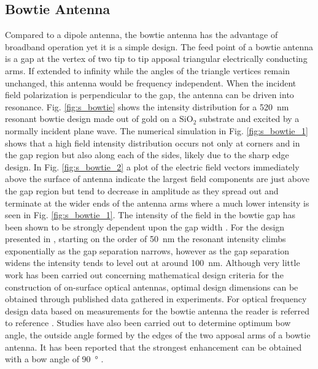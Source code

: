 \documentclass[11pt]{article}
\begin{document}
\subsection{Bowtie Antenna}
%
Compared to a dipole antenna, the bowtie antenna has the advantage of broadband operation yet it is a simple design. The feed point of a bowtie antenna is a gap at the vertex of two tip to tip apposal triangular electrically conducting arms. If extended to infinity while the angles of the triangle vertices remain unchanged, this antenna would be frequency independent. When the incident field polarization is perpendicular to the gap, the antenna can be driven into resonance. Fig. \ref{fig:s_bowtie} shows the intensity distribution for a \SI{520}{\nm} resonant bowtie design made out of gold on a $\text{SiO}_2$ substrate and excited by a normally incident plane wave. The numerical simulation in Fig. \ref{fig:s_bowtie_1} shows that a high field intensity distribution occurs not only at corners and in the gap region but also along each of the sides, likely due to the sharp edge design. In Fig. \ref{fig:s_bowtie_2} a plot of the electric field vectors immediately above the surface of antenna indicate the largest field components are just above the gap region but tend to decrease in amplitude as they spread out and terminate at the wider ends of the antenna arms where a much lower intensity is seen in Fig.
\ref{fig:s_bowtie_1}. The intensity of the field in the bowtie gap has been shown
to be strongly dependent upon the gap width \cite{Schuck2005}. For the design presented in \cite{Schuck2005}, starting on the order of \SI{50}{\nm} the resonant intensity climbs exponentially as the gap separation narrows, however as the gap separation widens the intensity tends to level out at around \SI{100}{\nm}. Although very little work has been carried out concerning mathematical design criteria for the construction of on-surface optical antennas, optimal design dimensions can be obtained through published data gathered in experiments. For optical frequency design data based on measurements for the bowtie antenna the reader is referred to reference \cite{Fischer2008}. Studies have also been carried out to determine optimum bow angle, the outside angle formed by the edges of the two apposal arms of a bowtie antenna. It has been reported that the strongest enhancement can be obtained with a bow angle of \SI{90}{\degree} \cite{Fischer2008}.
%
\end{document}
